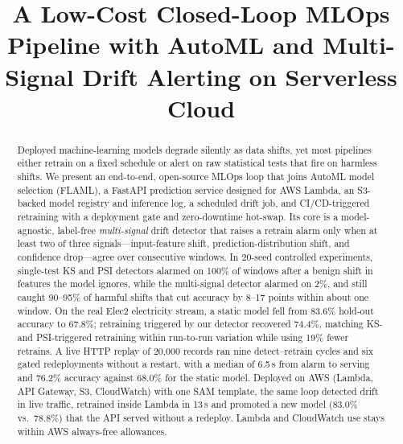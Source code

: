 \documentclass[conference]{IEEEtran}
\begin{document}
\title{A Low-Cost Closed-Loop MLOps Pipeline with AutoML and Multi-Signal Drift Alerting on Serverless Cloud}

\author{
\and
{}
\and
{}
}

\maketitle

\begin{abstract}
Deployed machine-learning models degrade silently as data shifts, yet most pipelines either retrain on a fixed schedule or alert on raw statistical tests that fire on harmless shifts. We present an end-to-end, open-source MLOps loop that joins AutoML model selection (FLAML), a FastAPI prediction service designed for AWS Lambda, an S3-backed model registry and inference log, a scheduled drift job, and CI/CD-triggered retraining with a deployment gate and zero-downtime hot-swap. Its core is a model-agnostic, label-free \emph{multi-signal} drift detector that raises a retrain alarm only when at least two of three signals---input-feature shift, prediction-distribution shift, and confidence drop---agree over consecutive windows. In 20-seed controlled experiments, single-test KS and PSI detectors alarmed on 100\% of windows after a benign shift in features the model ignores, while the multi-signal detector alarmed on 2\%, and still caught 90--95\% of harmful shifts that cut accuracy by 8--17 points within about one window. On the real Elec2 electricity stream, a static model fell from 83.6\% hold-out accuracy to 67.8\%; retraining triggered by our detector recovered 74.4\%, matching KS- and PSI-triggered retraining within run-to-run variation while using 19\% fewer retrains. A live HTTP replay of 20{,}000 records ran nine detect--retrain cycles and six gated redeployments without a restart, with a median of 6.5\,s from alarm to serving and 76.2\% accuracy against 68.0\% for the static model. Deployed on AWS (Lambda, API Gateway, S3, CloudWatch) with one SAM template, the same loop detected drift in live traffic, retrained inside Lambda in 13\,s and promoted a new model (83.0\% vs.\ 78.8\%) that the API served without a redeploy. Lambda and CloudWatch use stays within AWS always-free allowances.
\end{abstract}
\end{document}
